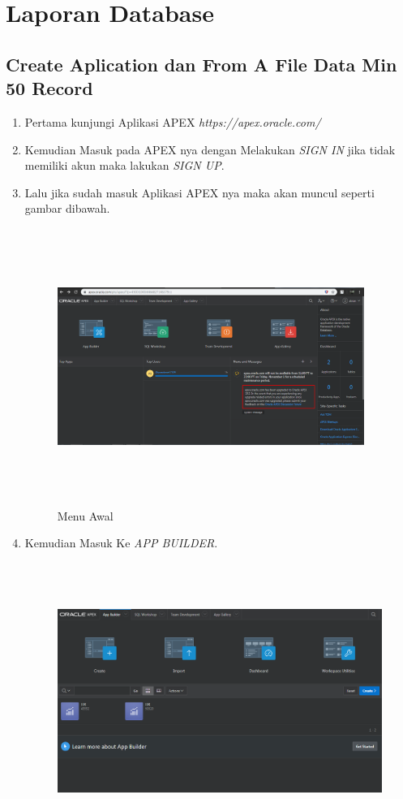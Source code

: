 \chapter{Laporan Database}
\section{Create Aplication dan From A File Data Min 50 Record}
\par
\begin{enumerate}
    \item Pertama kunjungi Aplikasi APEX \textit{https://apex.oracle.com/} 
    \item Kemudian Masuk pada APEX nya dengan Melakukan \textit{SIGN IN} jika tidak memiliki akun maka lakukan \textit{SIGN UP}.
    \item Lalu jika sudah masuk Aplikasi APEX nya maka akan muncul seperti gambar dibawah.
    \begin{figure}[!htbp]
\centering
\includegraphics[width=10cm,height=9cm]{figures/A.PNG}
\caption{Menu Awal}
\label{penanda}
\end{figure}
    \item Kemudian Masuk Ke \textit{APP BUILDER}.
\begin{figure}[!htbp]
\centering
\includegraphics[width=11cm,height=9cm]{figures/B.PNG}

\end{figure}
\end{enumerate}
